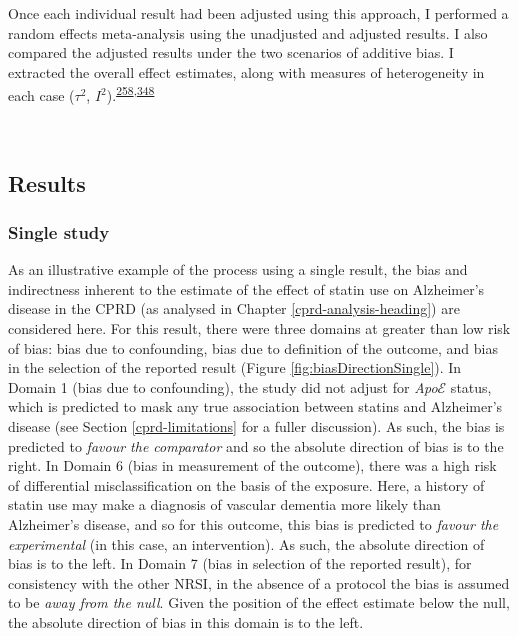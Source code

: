 \documentclass[a4paper, twoside]{templates/ociamthesis}
\begin{document}
Once each individual result had been adjusted using this approach, I performed a random effects meta-analysis using the unadjusted and adjusted results. I also compared the adjusted results under the two scenarios of additive bias. I extracted the overall effect estimates, along with measures of heterogeneity in each case (\(\tau^2\), \(I^2\)).\textsuperscript{\protect\hyperlink{ref-higgins2003}{258},\protect\hyperlink{ref-higgins2008}{348}}

~

\hypertarget{quant-tri-results}{%
\subsection{Results}\label{quant-tri-results}}

\hypertarget{single-study}{%
\subsubsection{Single study}\label{single-study}}

As an illustrative example of the process using a single result, the bias and indirectness inherent to the estimate of the effect of statin use on Alzheimer's disease in the CPRD (as analysed in Chapter \ref{cprd-analysis-heading}) are considered here. For this result, there were three domains at greater than low risk of bias: bias due to confounding, bias due to definition of the outcome, and bias in the selection of the reported result (Figure \ref{fig:biasDirectionSingle}). In Domain 1 (bias due to confounding), the study did not adjust for \emph{Apo}\(\mathcal{E}\) status, which is predicted to mask any true association between statins and Alzheimer's disease (see Section \ref{cprd-limitations} for a fuller discussion). As such, the bias is predicted to \emph{favour the comparator} and so the absolute direction of bias is to the right. In Domain 6 (bias in measurement of the outcome), there was a high risk of differential misclassification on the basis of the exposure. Here, a history of statin use may make a diagnosis of vascular dementia more likely than Alzheimer's disease, and so for this outcome, this bias is predicted to \emph{favour the experimental} (in this case, an intervention). As such, the absolute direction of bias is to the left. In Domain 7 (bias in selection of the reported result), for consistency with the other NRSI, in the absence of a protocol the bias is assumed to be \emph{away from the null}. Given the position of the effect estimate below the null, the absolute direction of bias in this domain is to the left.
\end{document}
